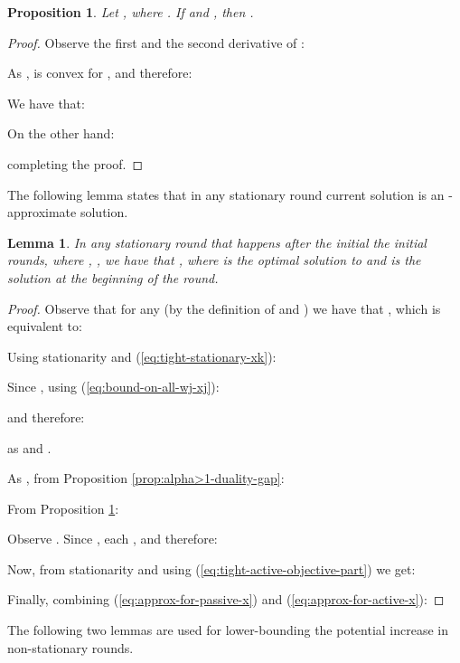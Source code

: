 \documentclass[11pt]{article}
\newtheorem{lemma}[theorem]{Lemma}
\newtheorem{proposition}[theorem]{Proposition}
\begin{document}
\begin{proposition}\label{prop:alpha>1-r-bound}
Let , where . If  and
 , 
then .
\end{proposition}
\begin{proof}

Observe the first and the second derivative of :

As ,  is convex for , and therefore: 
 
We have that:

On the other hand:

completing the proof.
\end{proof}

The following lemma states that in any stationary round current solution is an -approximate solution.
\begin{lemma}\label{lemma:alpha>1-stationary-near-opt}
In any stationary round that happens after the initial the initial  rounds, where , , we have that , where  is the optimal solution to  and  is the solution at the beginning of the round.
\end{lemma}
\begin{proof}
Observe that for any  (by the definition of  and ) we have that , which is equivalent to:


Using stationarity and (\ref{eq:tight-stationary-xk}):

Since , using (\ref{eq:bound-on-all-wj-xj}):

and therefore:

as  and .

As , from Proposition \ref{prop:alpha>1-duality-gap}:

From Proposition \ref{prop:alpha>1-r-bound}:


Observe . Since , each , and therefore:

Now, from stationarity  and using (\ref{eq:tight-active-objective-part}) we get:

Finally, combining (\ref{eq:approx-for-passive-x}) and (\ref{eq:approx-for-active-x}): 

\end{proof}
The following two lemmas are used for lower-bounding the potential increase in non-stationary rounds.
\end{document}
